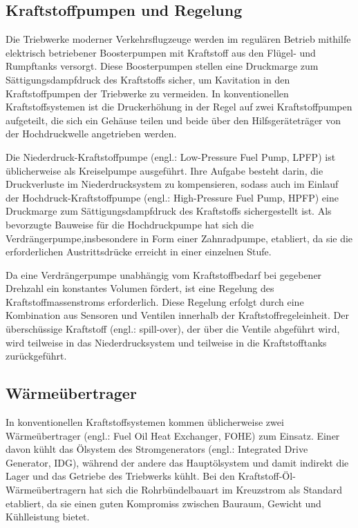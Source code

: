 \subsection{Kraftstoffpumpen und Regelung}

Die Triebwerke moderner Verkehrsflugzeuge werden im regulären Betrieb mithilfe elektrisch betriebener Boosterpumpen mit Kraftstoff aus den Flügel- und Rumpftanks versorgt. Diese Boosterpumpen stellen eine Druckmarge zum Sättigungsdampfdruck des Kraftstoffs sicher, um Kavitation in den Kraftstoffpumpen der Triebwerke zu vermeiden. In konventionellen Kraftstoffsystemen ist die Druckerhöhung in der Regel auf zwei Kraftstoffpumpen aufgeteilt, die sich ein Gehäuse teilen und beide über den Hilfsgeräteträger von der Hochdruckwelle angetrieben werden. \cite{Braunling.2015}

Die Niederdruck-Kraftstoffpumpe (engl.: Low-Pressure Fuel Pump, LPFP) ist üblicherweise als Kreiselpumpe ausgeführt. Ihre Aufgabe besteht darin, die Druckverluste im Niederdrucksystem zu kompensieren, sodass auch im Einlauf der Hochdruck-Kraftstoffpumpe (engl.: High-Pressure Fuel Pump, HPFP) eine  Druckmarge zum Sättigungsdampfdruck des Kraftstoffs sichergestellt ist. Als bevorzugte Bauweise für die Hochdruckpumpe hat sich die Verdrängerpumpe,insbesondere in Form einer Zahnradpumpe, etabliert, da sie  die erforderlichen Austrittsdrücke erreicht in einer einzelnen Stufe. \cite{Braunling.2015}

Da eine Verdrängerpumpe unabhängig vom Kraftstoffbedarf bei gegebener Drehzahl ein konstantes Volumen fördert, ist eine Regelung des Kraftstoffmassenstroms erforderlich. Diese Regelung erfolgt durch eine Kombination aus Sensoren und Ventilen innerhalb der Kraftstoffregeleinheit. Der überschüssige Kraftstoff (engl.: spill-over), der über die Ventile abgeführt wird, wird teilweise in das Niederdrucksystem und teilweise in die Kraftstofftanks zurückgeführt. \cite{Braunling.2015}

\subsection{Wärmeübertrager}

In konventionellen Kraftstoffsystemen kommen üblicherweise zwei Wärmeübertrager (engl.: Fuel Oil Heat Exchanger, FOHE) zum Einsatz. Einer davon kühlt das Ölsystem des Stromgenerators (engl.: Integrated Drive Generator, IDG), während der andere das Hauptölsystem und damit indirekt die Lager und das Getriebe des Triebwerks kühlt. Bei den Kraftstoff-Öl-Wärmeübertragern hat sich die Rohrbündelbauart im Kreuzstrom als Standard etabliert, da sie einen guten Kompromiss zwischen Bauraum, Gewicht und Kühlleistung bietet. \cite{Braunling.2015, LinkeDiesinger.2014}

